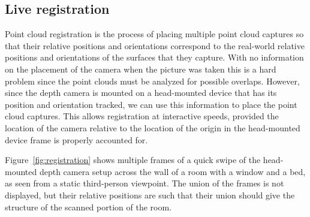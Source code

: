 \documentclass[pageno]{jpaper}
\begin{document}
\subsection{Live registration}

Point cloud registration is the process of placing multiple point cloud captures
so that their relative positions and orientations correspond to the real-world
relative positions and orientations of the surfaces that they capture. With no
information on the placement of the camera when the picture was taken this is a
hard problem since the point clouds must be analyzed for possible
overlaps. However, since the depth camera is mounted on a head-mounted device
that has its position and orientation tracked, we can use this information to
place the point cloud captures. This allows registration at interactive speeds,
provided the location of the camera relative to the location of the origin in
the head-mounted device frame is properly accounted for.

Figure~\ref{fig:registration} shows multiple frames of a quick swipe of the
head-mounted depth camera setup across the wall of a room with a window and a
bed, as seen from a static third-person viewpoint. The union of the frames is
not displayed, but their relative positions are such that their union should
give the structure of the scanned portion of the room.
\end{document}
